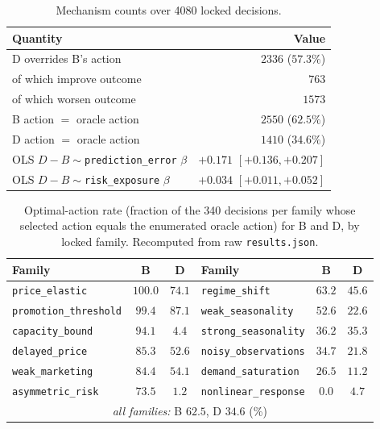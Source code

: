 \documentclass[10pt,twocolumn,a4paper]{article}
\newcommand{\code}[1]{\texttt{#1}}
\newcommand{\dvb}{\ensuremath{D\!-\!B}}
\begin{document}
\begin{table}[tbp]
\caption{Mechanism counts over 4080 locked decisions.}
\label{tab:mech}
\centering
\small
\begin{tabularx}{\columnwidth}{@{}Y r@{}}
\toprule
Quantity & Value \\
\midrule
D overrides B's action              & $2336$ ($57.3\%$) \\
\quad of which improve outcome      & $763$ \\
\quad of which worsen outcome       & $1573$ \\
B action $=$ oracle action          & $2550$ ($62.5\%$) \\
D action $=$ oracle action          & $1410$ ($34.6\%$) \\
OLS $\dvb\sim$\code{prediction\_error} $\beta$ & $+0.171$ $[+0.136,+0.207]$ \\
OLS $\dvb\sim$\code{risk\_exposure} $\beta$    & $+0.034$ $[+0.011,+0.052]$ \\
\bottomrule
\end{tabularx}
\end{table}

\begin{table}[tbp]
\caption{Optimal-action rate (fraction of the 340 decisions per family whose
selected action equals the enumerated oracle action) for B and D, by locked
family. Recomputed from raw \code{results.json}.}
\label{tab:optaction}
\centering
\small
\begin{tabular}{lcc|lcc}
\toprule
Family & B & D & Family & B & D \\
\midrule
\code{price\_elastic}      & $100.0$ & $74.1$ & \code{regime\_shift}      & $63.2$ & $45.6$ \\
\code{promotion\_threshold}& $99.4$  & $87.1$ & \code{weak\_seasonality}  & $52.6$ & $22.6$ \\
\code{capacity\_bound}     & $94.1$  & $4.4$  & \code{strong\_seasonality}& $36.2$ & $35.3$ \\
\code{delayed\_price}      & $85.3$  & $52.6$ & \code{noisy\_observations}& $34.7$ & $21.8$ \\
\code{weak\_marketing}     & $84.4$  & $54.1$ & \code{demand\_saturation} & $26.5$ & $11.2$ \\
\code{asymmetric\_risk}    & $73.5$  & $1.2$  & \code{nonlinear\_response}& $0.0$  & $4.7$  \\
\midrule
\multicolumn{6}{c}{\emph{all families:} B $62.5$, D $34.6$ (\%)} \\
\bottomrule
\end{tabular}
\end{table}
\end{document}
